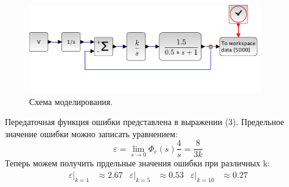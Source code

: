 \documentclass[a4paper, 11pt]{article}
\begin{document}
\begin{minipage}[t]{0.5\textwidth}
    \begin{figure}[H]
        \centering
        \includegraphics[width = 0.9\textwidth]{images/model2-2.pdf}
        \caption{Схема моделирования.}
    \end{figure}
\end{minipage}
\begin{minipage}[t]{0.5\textwidth}
    \vspace{0.5cm}
    Передаточная функция ошибки представлена в выражении (3).
    Предельное значение ошибки можно записать уравнением:
    \begin{equation}
        \varepsilon = \lim_{s\rightarrow 0}{\Phi_e(s)\frac{4}{s}} = \frac{8}{3k}
    \end{equation}
    Теперь можем получить прдельные значения ошибки при различных k:
    \begin{align*}
        \varepsilon|_{k = 1} & \approx 2.67 & \varepsilon|_{k = 5} & \approx 0.53 & \varepsilon|_{k = 10} & \approx 0.27
    \end{align*}
\end{minipage}
\end{document}
